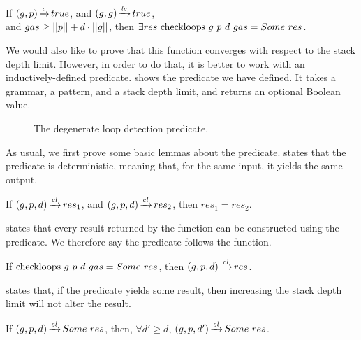 \begin{lemma}%
    If $(g,p) \operatorname{\xrightarrow{\mathit{c}}} true$,
    and $(g,g) \operatorname{\xrightarrow{\mathit{lc}}} true$, \\
    and $gas \ge ||p|| + d \cdot ||g||$,
    then $\exists res\ \checkloopscomp{g}{p}{d}{gas} = \Some res$.
    \label{lemma:checkloops-termination}
\end{lemma}

We would also like to prove that
this function converges with
respect to the stack depth limit.
However, in order to do that,
it is better to work with
an inductively-defined predicate.
 shows
the predicate we have defined.
It takes a grammar,
a pattern,
and a stack depth limit,
and returns an optional Boolean value.

\begin{figure}
    \centering
    
    \caption{The degenerate loop detection predicate.}
    \label{fig:checkloops}
\end{figure}

As usual, we first prove
some basic lemmas about the predicate.
states that the predicate
is deterministic,
meaning that, for the same input,
it yields the same output.

\begin{lemma}
    If $(g,p,d) \operatorname{\xrightarrow{\mathit{cl}}} res_1$,
    and $(g,p,d) \operatorname{\xrightarrow{\mathit{cl}}} res_2$,
    then $res_1 = res_2$.
    \label{lemma:checkloops-determinism}
\end{lemma}

states that every result returned by the function
can be constructed using the predicate.
We therefore say the predicate follows
the function.

\begin{lemma}
    If $\text{checkloops}\ g\ p\ d\ gas = Some\ res$,
    then $(g,p,d) \operatorname{\xrightarrow{\mathit{cl}}} res$.
    \label{lemma:checkloops-follows}
\end{lemma}

states that, if the predicate yields some result,
then increasing the stack depth limit
will not alter the result.

\begin{lemma}%
    If $(g,p,d) \operatorname{\xrightarrow{\mathit{cl}}} Some\ res$,
    then, $\forall d' \ge d$,
    $(g,p,d') \operatorname{\xrightarrow{\mathit{cl}}} Some\ res$.
    \label{lemma:checkloops-d-increase-no-overflow}
\end{lemma}

